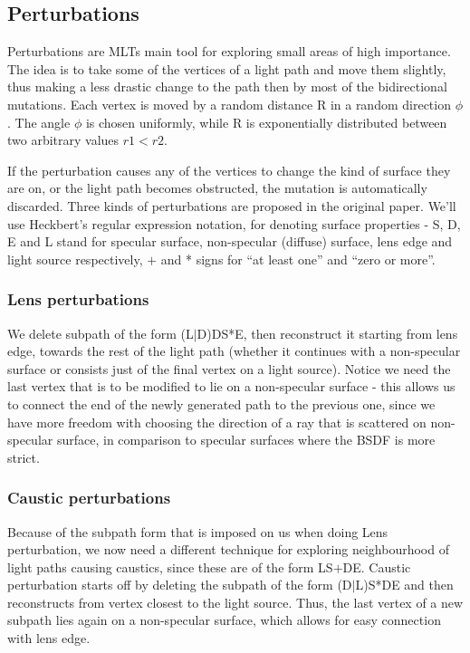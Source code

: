 \subsection{Perturbations} 

Perturbations are MLTs main tool for exploring small areas of high importance. The idea is to take some of the vertices of a light path and move them slightly, thus making a less drastic change to the path then by most of the bidirectional mutations. Each vertex is moved by a random distance R in a random direction $\phi$. The angle $\phi$ is chosen uniformly, while R is exponentially distributed between two arbitrary values $r1 < r2$. 

If the perturbation causes any of the vertices to change the kind of surface they are on, or the light path becomes obstructed, the mutation is automatically discarded. Three kinds of perturbations are proposed in the original paper. We'll use Heckbert's regular expression notation, for denoting surface properties - S, D, E and L stand for specular surface, non-specular (diffuse) surface, lens edge and light source respectively, $+$ and * signs for ``at least one'' and ``zero or more''.

\subsubsection{Lens perturbations}

We delete subpath of the form (L$|$D)DS*E, then reconstruct it starting from lens edge, towards the rest of the light path (whether it continues with a non-specular surface or consists just of the final vertex on a light source). Notice we need the last vertex that is to be modified to lie on a non-specular surface - this allows us to connect the end of the newly generated path to the previous one, since we have more freedom with choosing the direction of a ray that is scattered on non-specular surface, in comparison to specular surfaces where the BSDF is more strict.

\subsubsection{Caustic perturbations}

Because of the subpath form that is imposed on us when doing Lens perturbation, we now need a different technique for exploring neighbourhood of light paths causing caustics, since these are of the form LS$+$DE. Caustic perturbation starts off by deleting the subpath of the form (D$|$L)S*DE and then reconstructs from vertex closest to the light source. Thus, the last vertex of a new subpath lies again on a non-specular surface, which allows for easy connection with lens edge.


